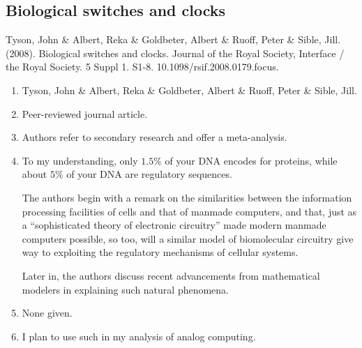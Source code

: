 \subsection*{Biological switches and clocks}
Tyson, John \& Albert, Reka \& Goldbeter, Albert \& Ruoff, Peter \& Sible, Jill. (2008). Biological switches and clocks. Journal of the Royal Society, Interface / the Royal Society. 5 Suppl 1. S1-8. 10.1098/rsif.2008.0179.focus. 
\begin{enumerate}
    \item Tyson, John \& Albert, Reka \& Goldbeter, Albert \& Ruoff, Peter \& Sible, Jill.
    \item Peer-reviewed journal article.
    \item Authors refer to secondary research and offer a meta-analysis.
    \item To my understanding, only $1.5\%$ of your DNA encodes for proteins, while about $5\%$ of your DNA are regulatory sequences.
    
    The authors begin with a remark on the similarities between the information processing facilities of cells and that of manmade computers, and that, just as a ``sophisticated theory of electronic circuitry'' made modern manmade computers possible, so too, will a similar model of biomolecular circuitry give way to exploiting the regulatory mechanisms of cellular systems. 

    Later in, the authors discuss recent advancements from mathematical modelers in explaining such natural phenomena.
    \item None given. 
    \item I plan to use such in my analysis of analog computing. 
\end{enumerate}

